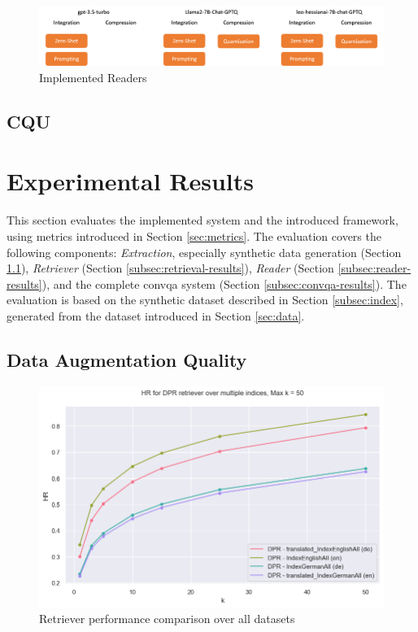 \begin{figure}
    \centering
    \includegraphics[width=\textwidth]{Grafiken/Evaluation/reader_implemented.png}
    \caption{Implemented Readers}
    \label{fig:reader-implementation}
\end{figure}

\subsection{CQU}
\label{subsec:cqu-impl}

\section{Experimental Results}
\label{sec:results}

This section evaluates the implemented system and the introduced framework, using metrics introduced in Section \ref{sec:metrics}. The evaluation covers the following components: \textit{Extraction}, especially synthetic data generation (Section \ref{subsec:data-augmentation-quality}), \textit{Retriever} (Section \ref{subsec:retrieval-results}), \textit{Reader} (Section \ref{subsec:reader-results}), and the complete \gls{convqa} system (Section \ref{subsec:convqa-results}). The evaluation is based on the synthetic dataset described in Section \ref{subsec:index}, generated from the dataset introduced in Section \ref{sec:data}.

\subsection{Data Augmentation Quality}
\label{subsec:data-augmentation-quality}

\begin{figure}
    \centering
    \includegraphics[width=\textwidth]{Grafiken/Evaluation/Data_Generation/hr_dpr_all_400.png}
    \caption{Retriever performance comparison over all datasets}
    \label{fig:synthetic-data-generation-performance-comparison}
\end{figure}

